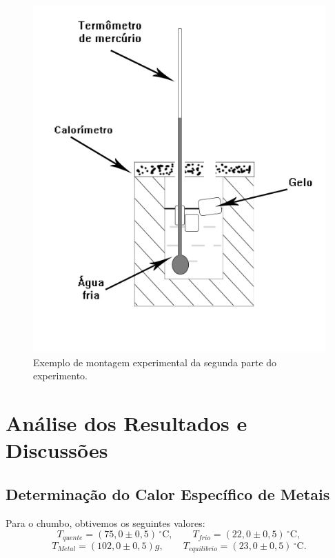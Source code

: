 \documentclass[12pt,a4paper]{article}
\begin{document}
\begin{figure}[!htbp]
\centering
\includegraphics[scale=0.55]{Fig6b2.jpg}
\caption{Exemplo de montagem experimental da segunda parte do experimento.}
\label{CalorGelo}
\end{figure}


\section{Análise dos Resultados e Discussões}


\subsection{Determinação do Calor Específico de Metais}

Para o chumbo, obtivemos os seguintes valores:
$$ T_{quente} = (75,0 \pm 0,5)\,^{\circ}\mathrm{C}, \qquad T_{frio} = (22,0 \pm 0,5)\,^{\circ}\mathrm{C}, $$
$$ T_{Metal} = (102,0 \pm 0,5)g, \qquad T_{equilibrio} = (23,0 \pm 0,5)\,^{\circ}\mathrm{C}. $$
\end{document}
